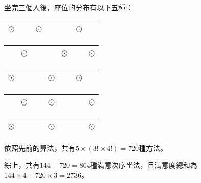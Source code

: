 \documentclass[math]{answer}
\begin{document}
\begin{questions}
{\begin{itemize}
			      坐完三個人後，座位的分布有以下五種：
			      \begin{table}[H]
				      \centering
				      \begin{tabular}{|p{0.3cm}|p{0.3cm}|p{0.3cm}|p{0.3cm}|p{0.3cm}|p{0.3cm}|p{0.3cm}|}
					      \hline
					      $\odot$ & ~ & $\odot$ & ~ & ~ & $\odot$ & ~ \\
					      \hline
				      \end{tabular}
				      \begin{tabular}{|p{0.3cm}|p{0.3cm}|p{0.3cm}|p{0.3cm}|p{0.3cm}|p{0.3cm}|p{0.3cm}|}
					      \hline
					      ~ & $\odot$ & ~ & ~ & $\odot$ & ~ & $\odot$ \\
					      \hline
				      \end{tabular}
			      \end{table}
			      \begin{table}[H]
				      \centering
				      \begin{tabular}{|p{0.3cm}|p{0.3cm}|p{0.3cm}|p{0.3cm}|p{0.3cm}|p{0.3cm}|p{0.3cm}|}
					      \hline
					      $\odot$ & ~ & ~ & $\odot$ & ~ & $\odot$ & ~ \\
					      \hline
				      \end{tabular}
				      \begin{tabular}{|p{0.3cm}|p{0.3cm}|p{0.3cm}|p{0.3cm}|p{0.3cm}|p{0.3cm}|p{0.3cm}|}
					      \hline
					      ~ & $\odot$ & ~ & $\odot$ & ~ & ~ & $\odot$ \\
					      \hline
				      \end{tabular}
			      \end{table}
			      \begin{table}[H]
				      \centering
				      \begin{tabular}{|p{0.3cm}|p{0.3cm}|p{0.3cm}|p{0.3cm}|p{0.3cm}|p{0.3cm}|p{0.3cm}|}
					      \hline
					      $\odot$ & ~ & ~ & $\odot$ & ~ & ~ & $\odot$ \\
					      \hline
				      \end{tabular}
			      \end{table}
			      依照先前的算法，共有$5 \times (3! \times 4!) = 720$種方法。
		\end{itemize}
		綜上，共有$144 + 720 = 864$種滿意次序坐法，且滿意度總和為$144 \times 4+720 \times 3 = 2736$。
	}

	\question
	\begin{parts}

\end{parts}
\end{questions}
\end{document}
